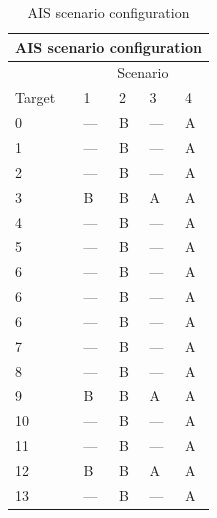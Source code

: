 \begin{table}
\centering
	\begin{tabularx}{0.5\textwidth}{XXXXX}
	  \multicolumn{5}{c}{AIS scenario configuration} \\
	  \toprule
	  		 & \multicolumn{4}{c}{Scenario} \\
	  Target & 1 	& 2 	&  3 	&  4 	\\
	  \midrule
	  0 	& --- 	& B 	& --- 	& A 	\\
	  1 	& --- 	& B 	& --- 	& A 	\\
	  2 	& --- 	& B 	& --- 	& A 	\\
	  3 	& B 	& B 	& A 	& A 	\\
	  4 	& --- 	& B 	& --- 	& A 	\\
	  5 	& --- 	& B 	& --- 	& A 	\\
	  6 	& --- 	& B 	& --- 	& A 	\\
	  6 	& --- 	& B 	& --- 	& A 	\\
	  6 	& --- 	& B 	& --- 	& A 	\\
	  7 	& --- 	& B 	& --- 	& A 	\\
	  8 	& --- 	& B 	& --- 	& A 	\\
	  9 	& B 	& B 	& A 	& A 	\\
	  10 	& --- 	& B 	& --- 	& A 	\\
	  11 	& --- 	& B 	& --- 	& A 	\\
	  12 	& B 	& B 	& A 	& A 	\\
	  13 	& --- 	& B 	& --- 	& A 	\\
	  \bottomrule
	\end{tabularx}~\caption{AIS scenario configuration}\label{tab:ais_scenarios}
\end{table}